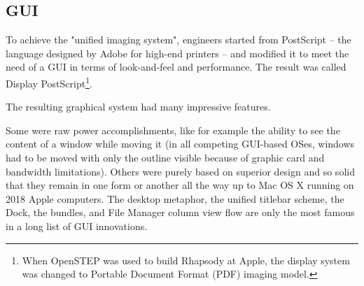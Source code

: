 \subsection{GUI}
 To achieve the "unified imaging system", \NeXT engineers started from PostScript -- the language designed by Adobe for high-end printers -- and modified it to meet the need of a GUI in terms of look-and-feel and performance. The result was called Display PostScript\footnote{When OpenSTEP was used to build Rhapsody at Apple, the display system was changed to Portable Document Format (PDF) imaging model.}.\\
\par
{}
\par
The resulting graphical system had many impressive features.\\
\par
 Some were raw power accomplishments, like for example the ability to see the content of a window while moving it (in all competing GUI-based OSes, windows had to be moved with only the outline visible because of graphic card and bandwidth limitations). Others were purely based on superior design and so solid that they remain in one form or another all the way up to Mac OS X running on 2018 Apple computers. The desktop metaphor, the unified titlebar scheme, the Dock, the bundles, and File Manager column view flow are only the most famous in a long list of GUI innovations.




